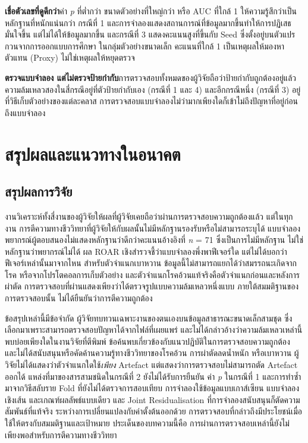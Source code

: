 \documentclass[11pt,a4paper]{article}
\newcommand{\storylabel}[1]{\textbf{#1}\quad}
\begin{document}
\storylabel{เชื่อตัวเลขที่ดูดีกว่า}ค่า \textit{p} ที่ต่ำกว่า ขนาดตัวอย่างที่ใหญ่กว่า
หรือ AUC ที่ใกล้ 1 ให้ความรู้สึกว่าเป็นหลักฐานที่หนักแน่นกว่า
กรณีที่ 1 และการจำลองแสดงสถานการณ์ที่ข้อมูลมากขึ้นทำให้การปฏิเสธมั่นใจขึ้น
แต่ไม่ได้ให้ข้อมูลมากขึ้น และกรณีที่ 3 แสดงคะแนนสูงที่ขึ้นกับ Seed
ซึ่งตั้งอยู่บนตัวแปรกวนจากการออกแบบการศึกษา ในกลุ่มตัวอย่างขนาดเล็ก
คะแนนที่ใกล้ 1 เป็นเหตุผลให้มองหาตัวแทน (Proxy) ไม่ใช่เหตุผลให้หยุดตรวจ

\storylabel{ตรวจแบบจำลอง แต่ไม่ตรวจป้ายกำกับ}การตรวจสอบทั้งหมดของผู้วิจัยถือว่าป้ายกำกับถูกต้องอยู่แล้ว
ความล้มเหลวสองในสี่กรณีอยู่ที่ตัวป้ายกำกับเอง (กรณีที่ 1 และ 4)
และอีกกรณีหนึ่ง (กรณีที่ 3) อยู่ที่วิธีเก็บตัวอย่างของแต่ละคลาส
การตรวจสอบแบบจำลองไม่ว่ามากเพียงใดก็เข้าไม่ถึงปัญหาที่อยู่ก่อนถึงแบบจำลอง

\section{สรุปผลและแนวทางในอนาคต}
\label{sec:conclusion}

\subsection{สรุปผลการวิจัย}
งานวิเคราะห์ทั้งสี่งานของผู้วิจัยให้ผลที่ผู้วิจัยเคยถือว่าผ่านการตรวจสอบความถูกต้องแล้ว
แต่ในทุกงาน การตีความทางชีววิทยาที่ผู้วิจัยให้กับผลนั้นไม่มีหลักฐานรองรับหรือไม่สามารถระบุได้
แบบจำลองพยากรณ์ผู้ตอบสนองไม่แสดงหลักฐานว่าดีกว่าคะแนนอ้างอิงที่
\textit{n} = 71 ซึ่งเป็นการไม่มีหลักฐาน ไม่ใช่หลักฐานว่าพยากรณ์ไม่ได้
ผล ROAR เชิงสำรวจชี้ว่าแบบจำลองพึ่งพาฟีเจอร์ใด แต่ไม่ได้บอกว่าฟีเจอร์เหล่านั้นมาจากไหน
สำหรับตัวจำแนกเบาหวาน ข้อมูลนี้ไม่สามารถแยกได้ว่าสมรรถนะเกิดจากโรค
หรือจากโปรโตคอลการเก็บตัวอย่าง
และตัวจำแนกโรคอ้วนแท้จริงคือตัวจำแนกก่อนและหลังการผ่าตัด
การตรวจสอบที่ผ่านแสดงเพียงว่าได้ตรวจรูปแบบความล้มเหลวหนึ่งแบบ
ภายใต้สมมติฐานของการตรวจสอบนั้น ไม่ได้ยืนยันว่าการตีความถูกต้อง

ข้อสรุปเหล่านี้มีข้อจำกัด ผู้วิจัยทบทวนเฉพาะงานของตนเองบนข้อมูลสาธารณะขนาดเล็กสามชุด
ซึ่งเลือกมาเพราะสามารถตรวจสอบปัญหาได้จากไฟล์ที่เผยแพร่
และไม่ได้กล่าวอ้างว่าความล้มเหลวเหล่านี้พบบ่อยเพียงใดในงานวิจัยที่ตีพิมพ์
ข้อค้นพบเกี่ยวข้องกับแนวปฏิบัติในการตรวจสอบความถูกต้อง
และไม่ได้สนับสนุนหรือคัดค้านความรู้ทางชีววิทยาของโรคอ้วน การผ่าตัดลดน้ำหนัก หรือเบาหวาน
ผู้วิจัยไม่ได้แสดงว่าตัวจำแนกใดใช้\textit{เพียง} Artefact
แต่แสดงว่าการตรวจสอบไม่สามารถตัด Artefact ออกได้
แหล่งที่มาของสารสามชนิดในกรณีที่ 2 ยังไม่ได้รับการยืนยัน
ค่า \textit{p} ในกรณีที่ 1 และการทำซ้ำมาจากวิธีสลับราย Fold ที่ยังไม่ได้ตรวจการสอบเทียบ
การจำลองใช้ข้อมูลแบบเกาส์เซียน แบบจำลองเชิงเส้น และเกณฑ์ผลลัพธ์แบบเดียว
และ Joint Residualisation ที่การจำลองสนับสนุนก็ตัดความสัมพันธ์ที่แท้จริง
ระหว่างการเปลี่ยนแปลงกับค่าตั้งต้นออกด้วย
การตรวจสอบที่กล่าวถึงมีประโยชน์เมื่อใช้ให้ตรงกับสมมติฐานและเป้าหมาย
ประเด็นของบทความนี้คือ การผ่านการตรวจสอบเหล่านี้ยังไม่เพียงพอสำหรับการตีความทางชีววิทยา
\end{document}
